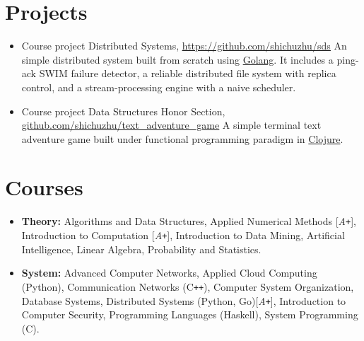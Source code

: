 \documentclass[11pt,a4paper,sans]{moderncv}        %
\begin{document}
\section{Projects}
\vspace{-5pt}
\begin{itemize}
	\item{
	      {Course project}
	      {\vspace{-10pt}}
	      {}
	      {Distributed Systems,
		      \href{https://github.com/shichuzhu/sds}
		      {\underline{https://github.com/shichuzhu/sds}}}
	      {
		      An simple distributed system built from scratch using \underline{Golang}.
		      It includes a ping-ack SWIM failure detector, a reliable distributed file system with replica control, and a stream-processing engine with a naive scheduler.
	      }}
	      
	\item{
	      {Course project}
	      {\vspace{-10pt}}
	      {}
	      {Data Structures Honor Section,
		      \href{https://github.com/shichuzhu/text_adventure_game}{\underline{github.com/shichuzhu/text\_adventure\_game}}
	      }
	      {
		      A simple terminal text adventure game built under functional programming paradigm in \underline{Clojure}.}
	      }
\end{itemize}

\vspace{-5pt}
\section{Courses}
\vspace{-5pt}
\begin{itemize}\small
	\item \textbf{Theory:}
	      Algorithms and Data Structures,
	      Applied Numerical Methods [\emph{A\texttt{+}}],
	      Introduction to Computation [\emph{A\texttt{+}}],
	      Introduction to Data Mining,
	      Artificial Intelligence,
	      Linear Algebra,
	      Probability and Statistics.
	\item \textbf{System:}
	      Advanced Computer Networks,
	      Applied Cloud Computing (Python),
	      Communication Networks (C\texttt{++}),
	      Computer System Organization,
	      Database Systems,
	      Distributed Systems (Python, Go)[\emph{A\texttt{+}}],
	      Introduction to Computer Security,
	      Programming Languages (Haskell),
	      System Programming (C).
\end{itemize}
\end{document}
